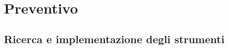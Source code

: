 %
%


\section{Preventivo} %
\label{sec:preventivo}
	\subsection{Ricerca e implementazione degli strumenti} %
	\label{sub:ricerca_e_implementazione_degli_strumenti}
